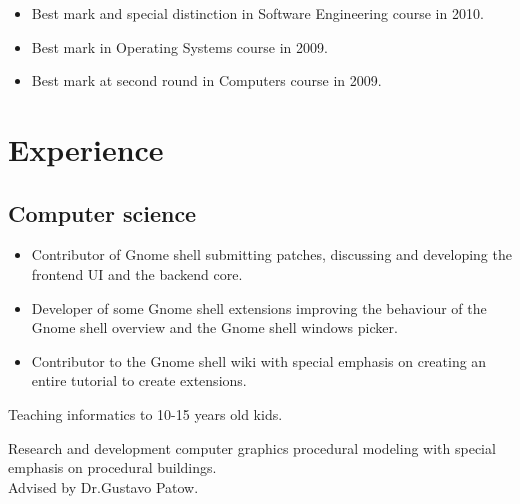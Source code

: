 {
    \begin{itemize}
        \item Best mark and special distinction in Software Engineering course in 2010.
        \item Best mark in Operating Systems course in 2009.
        \item Best mark at second round in Computers course in 2009.
    \end{itemize}
}



\section{Experience}

\subsection{Computer science}

{
    \begin{itemize}
      \item Contributor of Gnome shell submitting patches, discussing and developing the frontend UI and the backend core.
      \item Developer of some Gnome shell extensions improving the behaviour of the Gnome shell overview and the Gnome shell windows picker.
      \item Contributor to the Gnome shell wiki with special emphasis on creating an entire tutorial to create extensions.
    \end{itemize}
}


{
    Teaching informatics to 10-15 years old kids.
}


{
    Research and development computer graphics procedural modeling with special emphasis on procedural
    buildings. \\
    Advised by Dr.Gustavo Patow.
}

